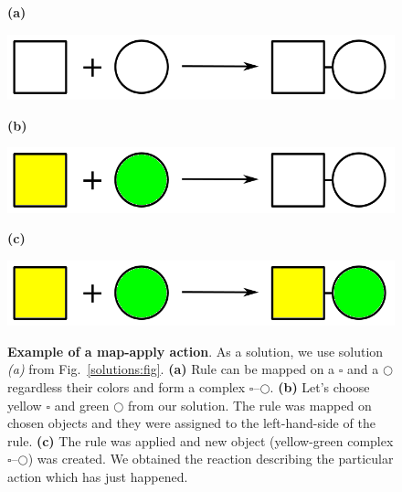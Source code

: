 \documentclass[12pt]{fithesis2}
\begin{document}
\begin{figure}[!h]
\begin{center}
\begin{minipage}[l]{0.1\textwidth}
    \textbf{(a)}
  \end{minipage}
  \begin{minipage}[r]{0.6\textwidth}
    {\hspace*{1.3cm}\includegraphics[scale=0.2]{pics/rule_complex}}
\end{minipage}

\begin{minipage}[l]{0.1\textwidth}
    \textbf{(b)}
  \end{minipage}
  \begin{minipage}[r]{0.6\textwidth}
    {\hspace*{1.3cm}\includegraphics[scale=0.2]{pics/rule_complex_mapped}}
\end{minipage}

\begin{minipage}[l]{0.1\textwidth}
    \textbf{(c)}
  \end{minipage}
  \begin{minipage}[r]{0.6\textwidth}
    {\hspace*{1.3cm}\includegraphics[scale=0.2]{pics/rule_reaction}}
\end{minipage}
\caption{\textbf{Example of a map-apply action}. As a solution, we use solution \textit{(a)} from Fig.~\ref{solutions:fig}. \textbf{(a)} Rule can be mapped on a $\square$ and a $\bigcirc$ regardless their colors and form a complex $\square$--$\bigcirc$.  \textbf{(b)} Let's choose yellow $\square$ and green $\bigcirc$ from our solution. The rule was mapped on chosen objects and they were assigned to the left-hand-side of the rule. \textbf{(c)} The rule was applied and new object (yellow-green complex $\square$--$\bigcirc$) was created. We obtained the reaction describing the particular action which has just happened.}
\label{map-apply:fig}
\end{center}
\end{figure}
\end{document}
